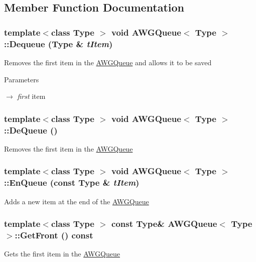 \subsection{Member Function Documentation}
\hypertarget{classAWGQueue_a9f0de0508811cf9c866db01279b9fe87}{
\subsubsection[{Dequeue}]{\setlength{\rightskip}{0pt plus 5cm}template$<$class Type $>$ void {\bf AWGQueue}$<$ Type $>$::Dequeue (Type \& {\em tItem})}}
\label{classAWGQueue_a9f0de0508811cf9c866db01279b9fe87}
Removes the first item in the \hyperlink{classAWGQueue}{AWGQueue} and allows it to be saved


\begin{DoxyParams}{Parameters}
\item[\mbox{$\rightarrow$} {\em first}]item \end{DoxyParams}
\hypertarget{classAWGQueue_afa93a1624254d57529c8d3fe95c560ca}{
\subsubsection[{DeQueue}]{\setlength{\rightskip}{0pt plus 5cm}template$<$class Type $>$ void {\bf AWGQueue}$<$ Type $>$::DeQueue ()}}
\label{classAWGQueue_afa93a1624254d57529c8d3fe95c560ca}
Removes the first item in the \hyperlink{classAWGQueue}{AWGQueue} \hypertarget{classAWGQueue_a2eadbdc35a395e441e7c05905217e763}{
\subsubsection[{EnQueue}]{\setlength{\rightskip}{0pt plus 5cm}template$<$class Type $>$ void {\bf AWGQueue}$<$ Type $>$::EnQueue (const Type \& {\em tItem})}}
\label{classAWGQueue_a2eadbdc35a395e441e7c05905217e763}
Adds a new item at the end of the \hyperlink{classAWGQueue}{AWGQueue} \hypertarget{classAWGQueue_a8553079c1e8edd832226f7e25a1f53c6}{
\subsubsection[{GetFront}]{\setlength{\rightskip}{0pt plus 5cm}template$<$class Type $>$ const Type\& {\bf AWGQueue}$<$ Type $>$::GetFront () const}}
\label{classAWGQueue_a8553079c1e8edd832226f7e25a1f53c6}
Gets the first item in the \hyperlink{classAWGQueue}{AWGQueue}

